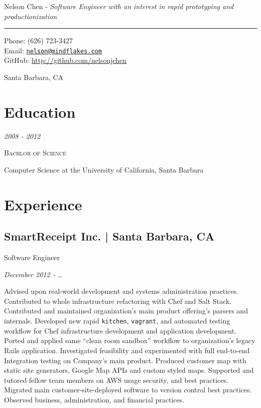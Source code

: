 \documentclass[10pt, letter]{article}
\makeatletter
\def\myname{Nelson Chen}
\def\myemail{nelson@mindflakes.com}
\def\mycellphone{(626) 723-3427}
\def\myaddress{Santa Barbara, CA}
\def\mygithub{nelsonjchen}
\newcommand{\years}[1]{\marginnote{#1}}
\renewcommand{\years}[1]{{\emph{#1}}}
\makeatother
\begin{document}
{\LARGE \myname} - \emph{Software Engineer with an interest in rapid prototyping and productionization}\\
\hrule
\begin{multicols}{2}
{Phone: \mycellphone}\\[.01cm]
{Email: \href{mailto:\myemail}{\texttt{\myemail}}}\\[.05cm]
{GitHub: \href{http://www.github.com/\mygithub}{http://github.com/\mygithub}}

\myaddress


\section*{Education}

\years{2008 - 2012}

\textsc{Bachlor of Science}

Computer Science at the University of California, Santa Barbara

\section*{Experience}

\subsection*{SmartReceipt Inc. | {\footnotesize{Santa Barbara, CA}}}

Software Engineer

\years{December 2012 - \ldots}

Advised upon real-world development and systems administration practices.
Contributed to whole infrastructure refactoring with Chef and Salt Stack.
Contributed and maintained organization's main product offering's parsers and
internals. Developed new rapid \texttt{kitchen}, \texttt{vagrant}, and
automated testing workflow for Chef infrastructure development and application
development. Ported and applied same ``clean room sandbox'' workflow to
organization's legacy Rails application. Investigated feasibility and
experimented with full end-to-end Integration testing on Company's main
product. Produced customer map with static site generators, Google Map APIs
and custom styled maps. Supported and tutored fellow team members on AWS usage
security, and best practices. Migrated main customer-site-deployed software to
version control best practices.  Observed business, administration, and
financial practices.


\end{multicols}
\end{document}
